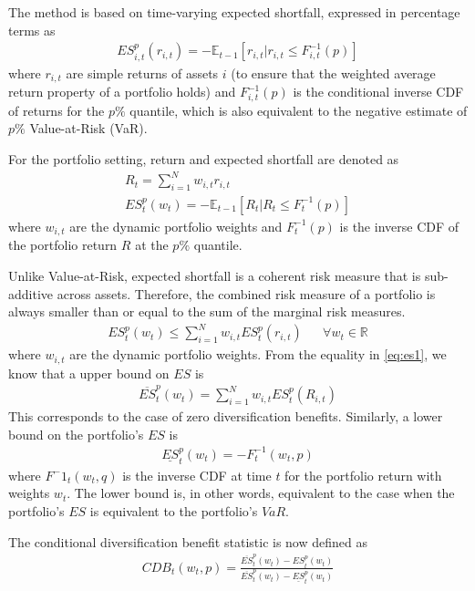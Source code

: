 The method is based on time-varying expected shortfall, expressed in percentage terms as
\begin{align}
    ES^p_{i,t}(r_{i,t}) = -\mathbb{E}_{t-1}[r_{i,t} | r_{i,t} \leq F_{i,t}^{-1}(p)]
\end{align}
where $r_{i,t}$ are simple returns of assets $i$ (to ensure that the weighted average return property of a portfolio holds) and $F_{i,t}^{-1}(p)$ is the conditional inverse CDF of returns for the $p\%$ quantile, which is also equivalent to the negative estimate of $p\%$ Value-at-Risk (VaR).

For the portfolio setting, return and expected shortfall are denoted as
\begin{align}
    R_{t} = \sum\limits^N_{i=1} w_{i,t} r_{i,t} \\
    ES^p_t(w_t) = -\mathbb{E}_{t-1}[R_{t} | R_{t} \leq F_{t}^{-1}(p)]
\end{align}
where $w_{i,t}$ are the dynamic portfolio weights and $F_{t}^{-1}(p)$ is the inverse CDF of the portfolio return $R$ at the $p\%$ quantile.

Unlike Value-at-Risk, expected shortfall is a coherent risk measure that is sub-additive across assets. Therefore, the combined risk measure of a portfolio is always smaller than or equal to the sum of the marginal risk measures.
\begin{align} \label{eq:es1}
    ES^p_t(w_t) \leq \sum\limits^N_{i=1} w_{i,t} ES^p_t(r_{i,t}) && \forall w_t \in \mathbb{R}
\end{align}
where $w_{i,t}$ are the dynamic portfolio weights. From the equality in \autoref{eq:es1}, we know that a upper bound on $ES$ is
\begin{align}
    \overline{ES}^p_t(w_t) = \sum\limits^N_{i=1} w_{i,t} ES^p_t(R_{i,t})
\end{align}
This corresponds to the case of zero diversification benefits. Similarly, a lower bound on the portfolio's $ES$ is
\begin{align}
    \underline{ES}^p_t(w_t) = -F^{-1}_t(w_t, p) 
\end{align}
where $F^-1_t(w_t, q)$ is the inverse CDF at time $t$ for the portfolio return with weights $w_t$. The lower bound is, in other words, equivalent to the case when the portfolio's $ES$ is equivalent to the portfolio's $VaR$.

The conditional diversification benefit statistic is now defined as
\begin{align}
    CDB_t(w_t,p) = \frac{\overline{ES}^p_t(w_t) - ES^p_t(w_t)}{\overline{ES}^p_t(w_t) - \underline{ES}^p_t(w_t)}
\end{align}

